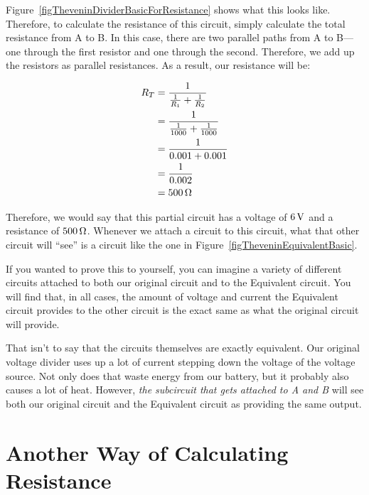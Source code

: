 
Figure~\ref{figTheveninDividerBasicForResistance} shows what this looks like.
Therefore, to calculate the \thev resistance of this circuit, simply calculate the total resistance from A to B.
In this case, there are two parallel paths from A to B---one through the first resistor and one through the second.
Therefore, we add up the resistors as parallel resistances.
As a result, our \thev resistance will be:

\begin{align*}
R_T &= \frac{1}{\frac{1}{R_1} + \frac{1}{R_2}} \\
    &= \frac{1}{\frac{1}{1000} + \frac{1}{1000}} \\
    &= \frac{1}{0.001 + 0.001} \\
    &= \frac{1}{0.002} \\
    &= 500\,\si{\ohm}
\end{align*}

Therefore, we would say that this partial circuit has a \thev voltage of $6\,\si{\volt}$ and a \thev resistance of $500\,\si{\ohm}$.
Whenever we attach a circuit to this circuit, what that other circuit will ``see'' is a circuit like the one in Figure~\ref{figTheveninEquivalentBasic}.


If you wanted to prove this to yourself, you can imagine a variety of different circuits attached to both our original circuit and to the \thev Equivalent circuit.
You will find that, in all cases, the amount of voltage and current the \thev Equivalent circuit provides to the other circuit is the exact same as what the original circuit will provide.

That isn't to say that the circuits themselves are exactly equivalent.
Our original voltage divider uses up a lot of current stepping down the voltage of the voltage source.
Not only does that waste energy from our battery, but it probably also causes a lot of heat.
However, \emph{the subcircuit that gets attached to A and B} will see both our original circuit and the \thev Equivalent circuit as providing the same output.

\section{Another Way of Calculating \thev Resistance}

